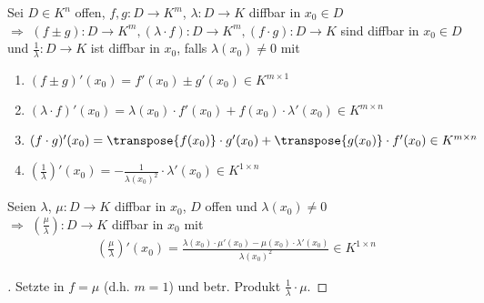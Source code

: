 \begin{proposition}[Rechenregeln]
	Sei $D\in K^n$ offen, $f,g: D\to K^m$, $\lambda: D\to K$  \gls{diffbar} in $x_0\in D$ \\
	$\Rightarrow$ $(f\pm g): D\to K^m, (\lambda\cdot f):D\to K^m, (f\cdot g):D\to K$ sind  \gls{diffbar} in $x_0\in D$ und $\frac{1}{\lambda}:D\to K$ ist  \gls{diffbar} in $x_0$, falls $\lambda(x_0)\neq 0$
	mit
	\begin{enumerate}[label={\alph*)}]
		\item $(f\pm g)'(x_0) = f'(x_0) \pm g'(x_0)\in K^{m\times 1}$
		\item $(\lambda\cdot f)'(x_0) = \lambda (x_0)\cdot f'(x_0) + f(x_0)\cdot \lambda'(x_0)\in K^{m\times n}$
		\item $(f\cdot g)' (x_0) = \transpose{f(x_0)}\cdot g'(x_0) + \transpose{g(x_0)}\cdot f'(x_0)\in K^{m\times n}$
		\item $\left( \frac{1}{\lambda}\right)'(x_0) = - \frac{1}{\lambda(x_0)^2}\cdot \lambda'(x_0)\in K^{1\times n}$
	\end{enumerate}
\end{proposition}

\begin{conclusion}
	Seien $\lambda$, $\mu:D\to K$  \gls{diffbar} in $x_0$, $D$ offen und $\lambda(x_0)\neq 0$ \\
	$\Rightarrow$ $\left( \frac{\mu}{\lambda} \right): D\to K$  \gls{diffbar} in $x_0$ mit \begin{align*}
		\left( \frac{\mu}{\lambda} \right)' (x_0) = \frac{\lambda(x_0)\cdot \mu'(x_0) - \mu(x_0) \cdot \lambda'(x_0)}{\lambda(x_0)^2}\in K^{1\times n}
	\end{align*}
\end{conclusion}

\begin{proof}[]
	Setzte in  $f=\mu$ (d.h. $m=1$) und betr. Produkt $\frac{1}{\lambda}\cdot \mu$.
\end{proof}

